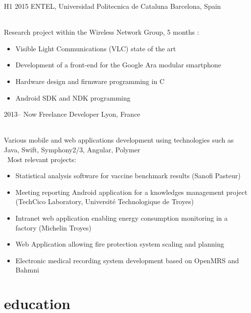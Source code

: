\documentclass[]{cv-style}          %
\begin{document}
\begin{entrylist}
 \entry
  {H1 2015  }
  {ENTEL, Universidad Politecnica de Cataluna}
  {Barcelona, Spain}
  {\\
  Research project within the Wireless Network Group, 5 months :
  \begin{itemize}
    \item Visible Light Communications (VLC) state of the art
    \item Development of a front-end for the Google Ara modular smartphone
    \item Hardware design and firmware programming in C
    \item Android SDK and NDK programming
  \end{itemize}}
\entry
  {2013-- Now}
  {Freelance Developer}
  {Lyon, France}
  {\\
  Various mobile and web applications development using technologies such as Java, Swift, Symphony2/3, Angular, Polymer\\\
  Most relevant projects:
  \begin{itemize}
  \item Statistical analysis software for vaccine benchmark results (Sanofi Pasteur)
    \item Meeting reporting Android application for a knowledges management project (TechCico Laboratory, Université Technologique de Troyes)
    \item Intranet web application enabling energy consumption monitoring in a factory (Michelin Troyes)
    \item Web Application allowing fire protection system scaling and planning
    \item Electronic medical recording system development based on OpenMRS and Bahmni
  \end{itemize}}
\end{entrylist}

\section{education}
\end{document}
